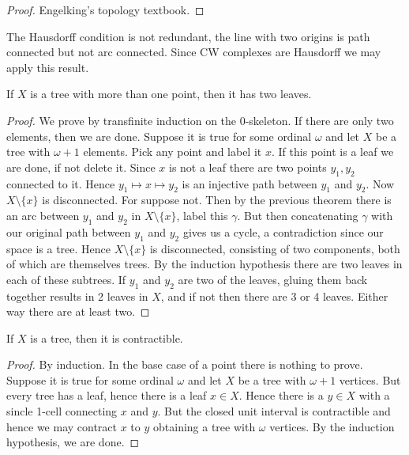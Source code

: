 \documentclass{book}                                                           %
\begin{document}
                \begin{proof}
                    Engelking's topology textbook.
                \end{proof}
                The Hausdorff condition is not redundant, the line with two
                origins is path connected but not arc connected. Since CW
                complexes are Hausdorff we may apply this result.
                \begin{theorem}
                    If $X$ is a tree with more than one point, then it has two
                    leaves.
                \end{theorem}
                \begin{proof}
                    We prove by transfinite induction on the 0-skeleton. If
                    there are only two elements, then we are done. Suppose it is
                    true for some ordinal $\omega$ and let $X$ be a tree with
                    $\omega+1$ elements. Pick any point and label it $x$. If
                    this point is a leaf we are done, if not delete it. Since
                    $x$ is not a leaf there are two points $y_{1},y_{2}$
                    connected to it. Hence $y_{1}\mapsto{x}\mapsto{y}_{2}$ is an
                    injective path between $y_{1}$ and $y_{2}$. Now
                    $X\setminus\{x\}$ is disconnected. For suppose not. Then by
                    the previous theorem there is an arc between $y_{1}$ and
                    $y_{2}$ in $X\setminus\{x\}$, label this $\gamma$. But then
                    concatenating $\gamma$ with our original path between
                    $y_{1}$ and $y_{2}$ gives us a cycle, a contradiction since
                    our space is a tree. Hence $X\setminus\{x\}$ is
                    disconnected, consisting of two components, both of which
                    are themselves trees. By the induction hypothesis there are
                    two leaves in each of these subtrees. If $y_{1}$ and $y_{2}$
                    are two of the leaves, gluing them back together results in
                    2 leaves in $X$, and if not then there are 3 or 4 leaves.
                    Either way there are at least two.
                \end{proof}
                \begin{theorem}
                    If $X$ is a tree, then it is contractible.
                \end{theorem}
                \begin{proof}
                    By induction. In the base case of a point there is nothing
                    to prove. Suppose it is true for some ordinal $\omega$ and
                    let $X$ be a tree with $\omega+1$ vertices. But every tree
                    has a leaf, hence there is a leaf $x\in{X}$. Hence there is
                    a $y\in{X}$ with a sincle 1-cell connecting $x$ and $y$. But
                    the closed unit interval is contractible and hence we may
                    contract $x$ to $y$ obtaining a tree with $\omega$ vertices.
                    By the induction hypothesis, we are done.
                \end{proof}
\end{document}
